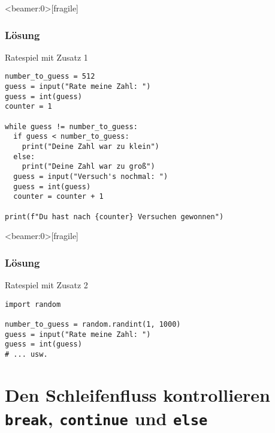 \begin{frame}<beamer:0>[fragile]
\frametitle{Lösung}
\begin{solutionblock}{Ratespiel mit Zusatz 1}
\begin{verbatim}
number_to_guess = 512
guess = input("Rate meine Zahl: ")
guess = int(guess)
counter = 1

while guess != number_to_guess:
  if guess < number_to_guess:
    print("Deine Zahl war zu klein")
  else:
    print("Deine Zahl war zu groß")
  guess = input("Versuch's nochmal: ")
  guess = int(guess)
  counter = counter + 1
  
print(f"Du hast nach {counter} Versuchen gewonnen")	
\end{verbatim}
\end{solutionblock}
\end{frame}






\begin{frame}<beamer:0>[fragile]
\frametitle{Lösung}
\begin{solutionblock}{Ratespiel mit Zusatz 2}
\begin{verbatim}
import random 

number_to_guess = random.randint(1, 1000)
guess = input("Rate meine Zahl: ")
guess = int(guess)
# ... usw. 
\end{verbatim}
\end{solutionblock}
\end{frame}


\section{Den Schleifenfluss kontrollieren  \\ \footnotesize \texttt{break}, \texttt{continue} und \texttt{else}}


